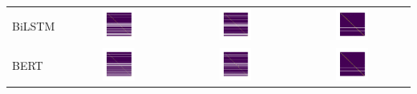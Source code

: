 \documentclass[a4paper]{article}
\begin{document}
\begin{table}[h]
\begin{adjustbox}{max width=\textwidth}
\begin{tabular}{l|ccc}
			BiLSTM &  \includegraphics[width=0.3\textwidth]{../assets/CM_BiLSTM_slot_ATIS_labeless} & \includegraphics[width=0.3\textwidth]{../assets/CM_BiLSTM_slot_remix_ATIS_labeless} &\includegraphics[width=0.3\textwidth]{../assets/CM_BiLSTM_slot_SNIPS_labeless} \\
			\cmidrule{1-4}
			BERT &  \includegraphics[width=0.3\textwidth]{../assets/CM_BERT_slot_ATIS_labeless} & \includegraphics[width=0.3\textwidth]{../assets/CM_BERT_slot_remix_ATIS_labeless} &\includegraphics[width=0.3\textwidth]{../assets/CM_BERT_slot_SNIPS_labeless} \\

\end{tabular}
\end{adjustbox}
\end{table}
\end{document}
